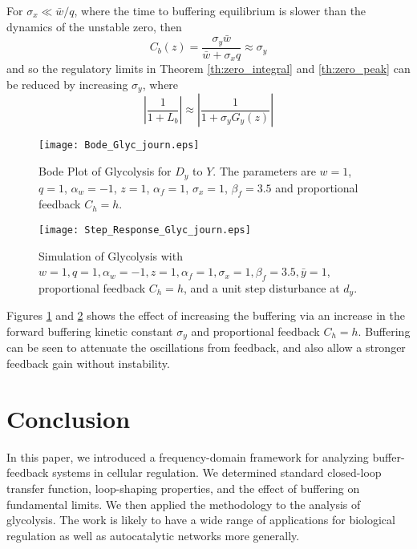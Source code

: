 \documentclass[letterpaper, 10 pt,  conference]{ieeeconf}  %
\begin{document}
For $\sigma_x\ll\bar{w}/q$, where the time to buffering equilibrium is slower than the dynamics of the unstable zero, then
\begin{equation*}
C_b(z)=\frac{\sigma_y\bar{w}}{\bar{w}+\sigma_xq}\approx\sigma_y
\end{equation*}
and so the regulatory limits in Theorem \ref{th:zero_integral} and \ref{th:zero_peak} can be reduced by increasing $\sigma_y$, where
\begin{equation*}
\left|\frac{1}{1+L_b}\right|\approx\left|\frac{1}{1+\sigma_yG_y(z)}\right|
\end{equation*}


\begin{figure}
\centering
    \texttt{[image: Bode\_Glyc\_journ.eps]}
\caption{Bode Plot of Glycolysis for $D_y$ to $Y$. The parameters are $w=1$, $q=1$, $ \alpha_w=-1$, $z=1$, $\alpha_f=1$, $\sigma_x=1$, $\beta_f=3.5$ and proportional feedback $C_h=h$.}
\label{fig:Bode}
\end{figure}

\begin{figure}
\centering
    \texttt{[image: Step\_Response\_Glyc\_journ.eps]}
\caption{Simulation of Glycolysis with  $w=1, q=1,\alpha_w=-1,z=1,\alpha_f=1,\sigma_x=1, \beta_f=3.5, \bar{y}=1$, proportional feedback $C_h=h$, and a unit step disturbance at $d_y$.}
\label{fig:Sim}
\end{figure}

Figures \ref{fig:Bode} and \ref{fig:Sim} shows the effect of increasing the buffering via an increase in the forward buffering kinetic constant $\sigma_y$ and proportional feedback $C_h=h$. Buffering can be seen to attenuate the oscillations from feedback, and also allow a stronger feedback gain without instability.

\section{Conclusion}

In this paper, we introduced a frequency-domain framework for analyzing buffer-feedback systems in cellular regulation. We determined standard closed-loop transfer function, loop-shaping properties, and the effect of buffering on fundamental limits. We then applied the methodology to the analysis of glycolysis. The work is likely to have a wide range of applications for biological regulation as well as autocatalytic networks more generally.

\appendices
\end{document}
